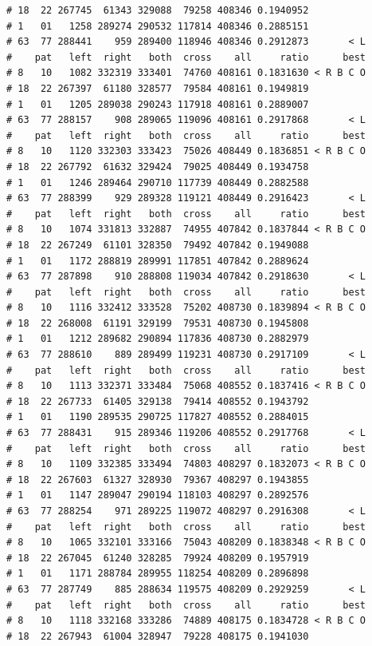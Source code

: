 \documentclass{article}\usepackage[]{graphicx}\usepackage[]{color}
\makeatletter
\newenvironment{kframe}{%
 \def\at@end@of@kframe{}%
 \ifinner\ifhmode%
  \def\at@end@of@kframe{\end{minipage}}%
  \begin{minipage}{\columnwidth}%
 \fi\fi%
 \def\FrameCommand##1{\hskip\@totalleftmargin \hskip-\fboxsep
 \colorbox{shadecolor}{##1}\hskip-\fboxsep
     \hskip-\linewidth \hskip-\@totalleftmargin \hskip\columnwidth}%
 \MakeFramed {\advance\hsize-\width
   \@totalleftmargin\z@ \linewidth\hsize
   \@setminipage}}%
 {\par\unskip\endMakeFramed%
 \at@end@of@kframe}
\newenvironment{knitrout}{}{} %
\makeatother
\begin{document}
\begin{knitrout}
\begin{kframe}
\begin{verbatim}
# 18  22 267745  61343 329088  79258 408346 0.1940952          
# 1   01   1258 289274 290532 117814 408346 0.2885151          
# 63  77 288441    959 289400 118946 408346 0.2912873       < L
#    pat   left  right   both  cross    all     ratio      best
# 8   10   1082 332319 333401  74760 408161 0.1831630 < R B C O
# 18  22 267397  61180 328577  79584 408161 0.1949819          
# 1   01   1205 289038 290243 117918 408161 0.2889007          
# 63  77 288157    908 289065 119096 408161 0.2917868       < L
#    pat   left  right   both  cross    all     ratio      best
# 8   10   1120 332303 333423  75026 408449 0.1836851 < R B C O
# 18  22 267792  61632 329424  79025 408449 0.1934758          
# 1   01   1246 289464 290710 117739 408449 0.2882588          
# 63  77 288399    929 289328 119121 408449 0.2916423       < L
#    pat   left  right   both  cross    all     ratio      best
# 8   10   1074 331813 332887  74955 407842 0.1837844 < R B C O
# 18  22 267249  61101 328350  79492 407842 0.1949088          
# 1   01   1172 288819 289991 117851 407842 0.2889624          
# 63  77 287898    910 288808 119034 407842 0.2918630       < L
#    pat   left  right   both  cross    all     ratio      best
# 8   10   1116 332412 333528  75202 408730 0.1839894 < R B C O
# 18  22 268008  61191 329199  79531 408730 0.1945808          
# 1   01   1212 289682 290894 117836 408730 0.2882979          
# 63  77 288610    889 289499 119231 408730 0.2917109       < L
#    pat   left  right   both  cross    all     ratio      best
# 8   10   1113 332371 333484  75068 408552 0.1837416 < R B C O
# 18  22 267733  61405 329138  79414 408552 0.1943792          
# 1   01   1190 289535 290725 117827 408552 0.2884015          
# 63  77 288431    915 289346 119206 408552 0.2917768       < L
#    pat   left  right   both  cross    all     ratio      best
# 8   10   1109 332385 333494  74803 408297 0.1832073 < R B C O
# 18  22 267603  61327 328930  79367 408297 0.1943855          
# 1   01   1147 289047 290194 118103 408297 0.2892576          
# 63  77 288254    971 289225 119072 408297 0.2916308       < L
#    pat   left  right   both  cross    all     ratio      best
# 8   10   1065 332101 333166  75043 408209 0.1838348 < R B C O
# 18  22 267045  61240 328285  79924 408209 0.1957919          
# 1   01   1171 288784 289955 118254 408209 0.2896898          
# 63  77 287749    885 288634 119575 408209 0.2929259       < L
#    pat   left  right   both  cross    all     ratio      best
# 8   10   1118 332168 333286  74889 408175 0.1834728 < R B C O
# 18  22 267943  61004 328947  79228 408175 0.1941030          

\end{verbatim}
\end{kframe}
\end{knitrout}
\end{document}
